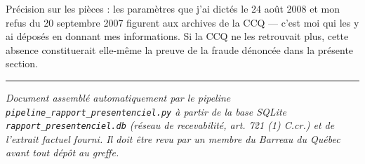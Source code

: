 \documentclass[12pt,a4paper]{article}
\begin{document}
Précision sur les pièces : les paramètres que j'ai dictés le 24 août 2008 et
mon refus du 20 septembre 2007 figurent aux archives de la CCQ — c'est moi
qui les y ai déposés en donnant mes informations. Si la CCQ ne les retrouvait
plus, cette absence constituerait elle-même la preuve de la fraude
dénoncée dans la présente section.


\vspace{0.8cm}
\hrule
\vspace{0.4em}
\small\emph{Document assemblé automatiquement par le pipeline \texttt{pipeline\_rapport\_presentenciel.py} à partir de la base SQLite \texttt{rapport\_presentenciel.db} (réseau de recevabilité, art. 721 (1) C.cr.) et de l'extrait factuel fourni. Il doit être revu par un membre du Barreau du Québec avant tout dépôt au greffe.}
\end{document}
